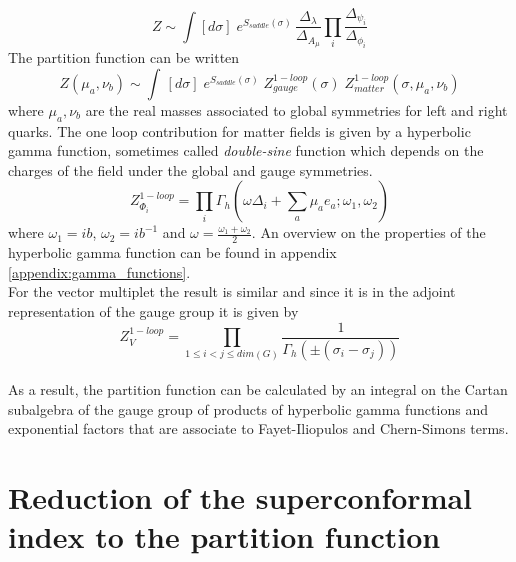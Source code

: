 \begin{equation}
Z \sim \int [ d \sigma] \; e^{S_{saddle}(\sigma)} \, \frac{ \Delta_{\lambda}}{\Delta_{A_{\mu}}} \prod_i \frac{ \Delta_{\psi_i}}{\Delta_{\phi_i}}
\label{eqn:localization_determinant_expression}
\end{equation}
The partition function can be written 
\begin{equation}
 Z (\mu_a , \nu_b) \sim \int \, [d  \sigma] \; e^{S_{saddle}(\sigma)} \; Z_{gauge}^{1-loop}(\sigma ) \; Z_{matter}^{1-loop}(\sigma,\mu_a,\nu_b)
\end{equation}
where $\mu_a,\nu_b$ are the real masses associated to global symmetries for left and right quarks. 
The one loop contribution for matter fields is given by a hyperbolic gamma function, sometimes called \emph{double-sine} function \cite{Hama:2011ea} which depends on the charges of the field under the global and gauge symmetries.
\begin{equation}
Z_{\Phi_i}^{1-loop} = \prod_{i}\Gamma_h ( \omega \Delta_i + \sum_{a} \mu_a e_a ; \omega_1 ,\omega_2)
\label{eqn:1-loop_localization_phi}
\end{equation}
where $\omega_1 = i b  $, $\omega_2 =  i b^{-1}$ and $\omega =\frac{\omega_1 + \omega_2}{2}$.
An overview on the properties of the hyperbolic gamma function can be found in appendix \ref{appendix:gamma_functions}.\\
For the vector multiplet the result is similar and since it is in the adjoint representation of the gauge group it is given by
\begin{equation}
Z_{V}^{1-loop} = \prod_{1 \leq i < j \leq dim(G)} \frac{1}{\Gamma_h( \pm (\sigma_i - \sigma_j) )}
\label{eqn:1-loop_localization_V}
\end{equation}
\\
As a result, the partition function can be calculated by an integral on the Cartan subalgebra of the gauge group of products of hyperbolic gamma functions and exponential factors that are associate to Fayet-Iliopulos and Chern-Simons terms. 


\section{Reduction of the superconformal index to the partition function}

